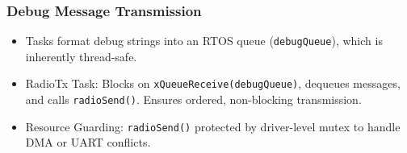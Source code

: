 \subsubsection*{Debug Message Transmission}
\begin{itemize}
    \item Tasks format debug strings into an RTOS queue (\texttt{debugQueue}), which is inherently thread-safe.
    \item RadioTx Task: Blocks on \texttt{xQueueReceive(debugQueue)}, dequeues messages, and calls \texttt{radioSend()}. Ensures ordered, non-blocking transmission.
    \item Resource Guarding: \texttt{radioSend()} protected by driver-level mutex to handle DMA or UART conflicts.
\end{itemize}
